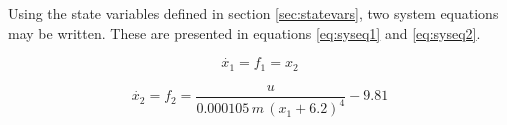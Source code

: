 Using the state variables defined in section \ref{sec:statevars}, two system equations may be written.
These are presented in equations \ref{eq:syseq1} and \ref{eq:syseq2}.

\begin{equation}
	\label{eq:syseq1}
	\dot{x_1} = f_1 = x_2
\end{equation}

\begin{equation}
	\label{eq:syseq2}
	\dot{x_2} = f_2 = {\frac {u}{0.000105\,m\,\left(x_1 + 6.2 \right) ^{4}}} - 9.81
\end{equation}